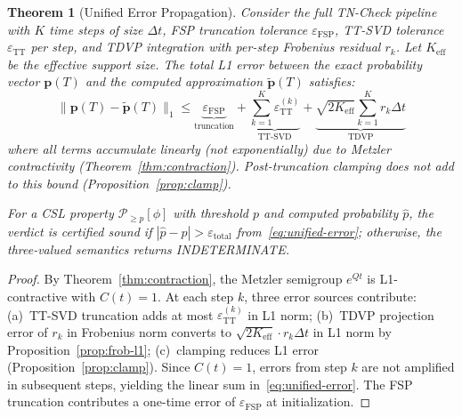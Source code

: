 \documentclass[11pt]{article}
\newtheorem{theorem}{Theorem}
\newcommand{\norm}[1]{\lVert #1 \rVert}
\begin{document}
\begin{theorem}[Unified Error Propagation]\label{thm:unified-error}
Consider the full TN-Check pipeline with $K$ time steps of size $\Delta t$,
FSP truncation tolerance $\varepsilon_{\mathrm{FSP}}$, TT-SVD tolerance
$\varepsilon_{\mathrm{TT}}$ per step, and TDVP integration with
per-step Frobenius residual $r_k$.
Let $K_{\mathrm{eff}}$ be the effective support size.
The total L1 error between the exact probability vector $\mathbf{p}(T)$
and the computed approximation $\tilde{\mathbf{p}}(T)$ satisfies:
\begin{equation}\label{eq:unified-error}
  \norm{\mathbf{p}(T) - \tilde{\mathbf{p}}(T)}_1
  \leq \underbrace{\varepsilon_{\mathrm{FSP}}}_{\text{truncation}}
  + \underbrace{\sum_{k=1}^{K} \varepsilon_{\mathrm{TT}}^{(k)}}_{\text{TT-SVD}}
  + \underbrace{\sqrt{2 K_{\mathrm{eff}}} \sum_{k=1}^{K} r_k \Delta t}_{\text{TDVP}}
\end{equation}
where all terms accumulate linearly (not exponentially) due to
Metzler contractivity (Theorem~\ref{thm:contraction}).
Post-truncation clamping does not add to this bound
(Proposition~\ref{prop:clamp}).

For a CSL property $\mathcal{P}_{\geq p}[\phi]$ with threshold $p$
and computed probability $\hat{p}$, the verdict is certified sound
if $|\hat{p} - p| > \varepsilon_{\mathrm{total}}$ from~\eqref{eq:unified-error};
otherwise, the three-valued semantics returns INDETERMINATE.
\end{theorem}

\begin{proof}
By Theorem~\ref{thm:contraction}, the Metzler semigroup $e^{Qt}$ is
L1-contractive with $C(t) = 1$.
At each step $k$, three error sources contribute:
(a)~TT-SVD truncation adds at most $\varepsilon_{\mathrm{TT}}^{(k)}$
in L1 norm;
(b)~TDVP projection error of $r_k$ in Frobenius norm converts to
$\sqrt{2K_{\mathrm{eff}}} \cdot r_k \Delta t$ in L1 norm by
Proposition~\ref{prop:frob-l1};
(c)~clamping reduces L1 error (Proposition~\ref{prop:clamp}).
Since $C(t) = 1$, errors from step $k$ are not amplified in subsequent
steps, yielding the linear sum in~\eqref{eq:unified-error}.
The FSP truncation contributes a one-time error of
$\varepsilon_{\mathrm{FSP}}$ at initialization.
\end{proof}
\end{document}
